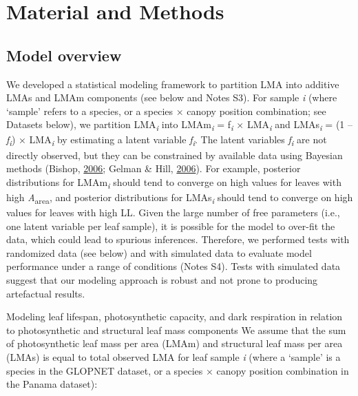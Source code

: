 \documentclass[12pt,]{article}
\theoremstyle{definition}
\theoremstyle{definition}
\theoremstyle{definition}
\theoremstyle{remark}
\begin{document}
\hypertarget{material-and-methods}{%
\section{Material and Methods}\label{material-and-methods}}

\hypertarget{model-overview}{%
\subsection{Model overview}\label{model-overview}}

We developed a statistical modeling framework to partition LMA into
additive LMAs and LMAm components (see below and Notes S3). For sample
\emph{i} (where `sample' refers to a species, or a species × canopy
position combination; see Datasets below), we partition
LMA\textsubscript{\emph{i}} into LMAm\textsubscript{\emph{i}} =
f\textsubscript{\emph{i}} × LMA\textsubscript{\emph{i}} and
LMAs\textsubscript{\emph{i}} = (1 -- \emph{f\textsubscript{i}}) ×
LMA\textsubscript{\emph{i}} by estimating a latent variable
\emph{f\textsubscript{i}}. The latent variables
\emph{f\textsubscript{i}} are not directly observed, but they can be
constrained by available data using Bayesian methods (Bishop,
\protect\hyperlink{ref-Bishop2006}{2006}; Gelman \& Hill,
\protect\hyperlink{ref-Gelman2006}{2006}). For example, posterior
distributions for LMAm\textsubscript{\emph{i}} should tend to converge
on high values for leaves with high \emph{A}\textsubscript{area}, and
posterior distributions for LMAs\textsubscript{\emph{i}} should tend to
converge on high values for leaves with high LL. Given the large number
of free parameters (i.e., one latent variable per leaf sample), it is
possible for the model to over-fit the data, which could lead to
spurious inferences. Therefore, we performed tests with randomized data
(see below) and with simulated data to evaluate model performance under
a range of conditions (Notes S4). Tests with simulated data suggest that
our modeling approach is robust and not prone to producing artefactual
results.

Modeling leaf lifespan, photosynthetic capacity, and dark respiration in
relation to photosynthetic and structural leaf mass components We assume
that the sum of photosynthetic leaf mass per area (LMAm) and structural
leaf mass per area (LMAs) is equal to total observed LMA for leaf sample
\emph{i} (where a `sample' is a species in the GLOPNET dataset, or a
species × canopy position combination in the Panama dataset):
\end{document}
